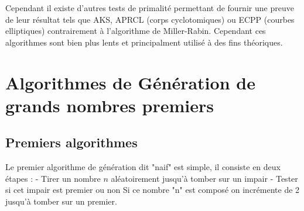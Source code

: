\documentclass{article}
\begin{document}
Cependant il existe d'autres tests de primalité permettant de fournir une preuve de leur résultat tels que AKS, APRCL (corps cyclotomiques) ou ECPP (courbes elliptiques) contrairement à l'algorithme de Miller-Rabin. Cependant ces algorithmes sont bien plus lents et principalment utilisé à des fins théoriques. 

\section{Algorithmes de Génération de grands nombres premiers}

\subsection*{Premiers algorithmes}

Le premier algorithme de génération dit "naif" est simple, il consiste en deux étapes :
    - Tirer un nombre $n$ aléatoirement jusqu'à tomber sur un impair
    - Tester si cet impair est premier ou non
        Si ce nombre "n" est composé on incrémente de 2 jusqu'à tomber sur un premier.
    

\begin{algorithm}



\end{algorithm}




 
  
\end{document}
